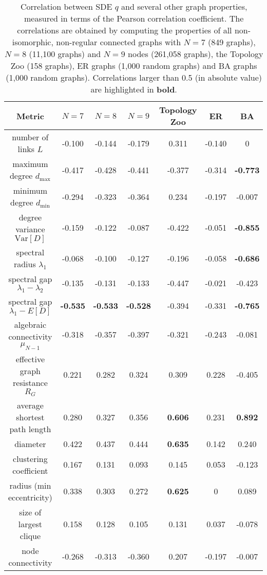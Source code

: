 \documentclass{comnet}%
\begin{document}
\begin{table}[H]
	\centering
	\caption{Correlation between SDE $q$ and several other graph properties, measured in terms of the Pearson correlation coefficient. The correlations are obtained by computing the properties of all non-isomorphic, non-regular connected graphs with $N=7$ (849 graphs), $N=8$ (11,100 graphs) and $N=9$ nodes (261,058 graphs), the Topology Zoo (158 graphs), ER graphs (1,000 random graphs) and BA graphs (1,000 random graphs). Correlations larger than 0.5 (in absolute value) are highlighted in \textbf{bold}.}
	\begin{tabular}{c|c|c|c|c|c|c}
		Metric & $N=7$ & $N=8$ & $N=9$ & Topology Zoo & ER & BA \\
		\hline\hline
		number of links $L$ & -0.100 & -0.144 & -0.179 & 0.311 & -0.140 & 0 \\
		maximum degree $d_{\max}$ & -0.417 & -0.428 & -0.441 & -0.377 & -0.314 & \textbf{-0.773} \\
		minimum degree $d_{\min}$ & -0.294 & -0.323 & -0.364 & 0.234 & -0.197 & -0.007 \\
		degree variance $\textrm{Var}[D]$ & -0.159 & -0.122 & -0.087 & -0.422 & -0.051 & \textbf{-0.855} \\
		spectral radius $\lambda_1$ & -0.068 & -0.100 & -0.127 & -0.196 & -0.058 & \textbf{-0.686} \\
		spectral gap $\lambda_1-\lambda_2$ & -0.135 & -0.131 & -0.133 & -0.447 & -0.021 & -0.423 \\
		spectral gap $\lambda_1 - E[D]$ & \textbf{-0.535} & \textbf{-0.533} & \textbf{-0.528} & -0.394 & -0.331 & \textbf{-0.765} \\
		algebraic connectivity $\mu_{N-1}$ & -0.318 & -0.357 & -0.397 & -0.321 & -0.243 & -0.081 \\
		effective graph resistance $R_G$ & 0.221 & 0.282 & 0.324 & 0.309 & 0.228 & -0.405 \\
		average shortest path length & 0.280 & 0.327 & 0.356 & \textbf{0.606} & 0.231 & \textbf{0.892} \\
		diameter & 0.422 & 0.437 & 0.444 & \textbf{0.635} & 0.142 & 0.240 \\
		clustering coefficient & 0.167 & 0.131 & 0.093 & 0.145 & 0.053 & -0.123 \\
		radius (min eccentricity) & 0.338 & 0.303 & 0.272 & \textbf{0.625} & 0 & 0.089 \\
		size of largest clique & 0.158 & 0.128 & 0.105 & 0.131 & 0.037 & -0.078 \\
		node connectivity & -0.268 & -0.313 & -0.360 & 0.207 & -0.197 & -0.007 \\

\end{tabular}
\end{table}
\end{document}
